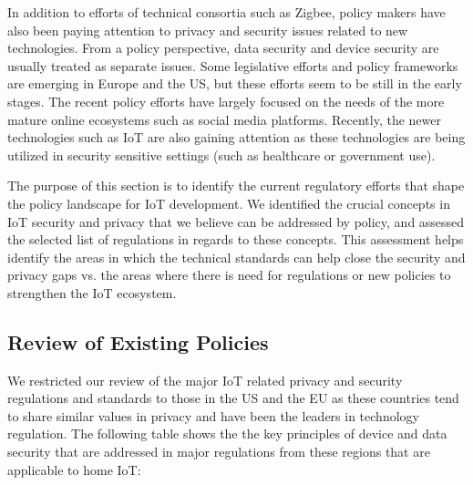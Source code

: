 In addition to efforts of technical consortia such as Zigbee, policy makers have also been paying attention to privacy and security issues related to new technologies. From a policy perspective, data security and device security are usually treated as separate issues. Some legislative efforts and policy frameworks are emerging in Europe and the US, but these efforts seem to be still in the early stages. The recent policy efforts have largely focused on the needs of the more mature online ecosystems such as social media platforms. Recently, the newer technologies such as IoT are also gaining attention as these technologies are being utilized in security sensitive settings (such as healthcare or government use).

The purpose of this section is to identify the current regulatory efforts that shape the policy landscape for IoT development. We identified the crucial concepts in IoT security and privacy that we believe can be addressed by policy, and assessed the selected list of regulations in regards to these concepts. This assessment helps identify the areas in which the technical standards can help close the security and privacy gaps vs. the areas where there is need for regulations or new policies to strengthen the IoT ecosystem.

\subsection{Review of Existing Policies}

We restricted our review of the major IoT related privacy and security regulations and standards to those in the US and the EU as these countries tend to share similar values in privacy and have been the leaders in technology regulation. The following table shows the the key principles of device and data security that are addressed in major regulations from these regions that are applicable to home IoT:

